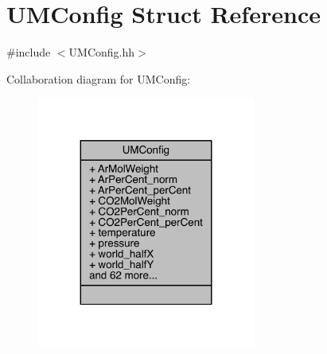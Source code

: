 \hypertarget{structUMConfig}{}\section{U\+M\+Config Struct Reference}
\label{structUMConfig}


{\ttfamily \#include $<$U\+M\+Config.\+hh$>$}



Collaboration diagram for U\+M\+Config\+:
\nopagebreak
\begin{figure}[H]
\begin{center}
\leavevmode
\includegraphics[width=203pt]{structUMConfig__coll__graph}
\end{center}
\end{figure}
